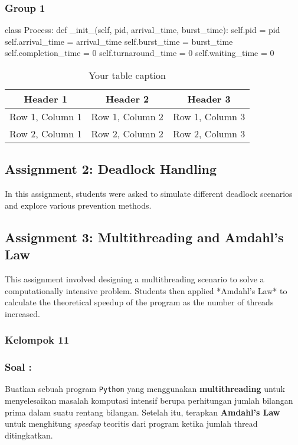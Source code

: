 \documentclass[12pt]{article}
\begin{document}
\subsubsection{Group 1}
\begin{python}
    class Process:
    def _init_(self, pid, arrival_time, burst_time):
    self.pid = pid
    self.arrival_time = arrival_time
    self.burst_time = burst_time
    self.completion_time = 0
    self.turnaround_time = 0
    self.waiting_time = 0
\end{python}

\begin{table}[htbp] %
    \centering
    \begin{tabular}{|c|c|c|} %
        \hline
        Header 1        & Header 2        & Header 3        \\ %
        \hline
        Row 1, Column 1 & Row 1, Column 2 & Row 1, Column 3 \\ %
        \hline
        Row 2, Column 1 & Row 2, Column 2 & Row 2, Column 3 \\ %
        \hline
    \end{tabular}
    \caption{Your table caption} %
    \label{tab:your_label} %
\end{table}

\subsection{Assignment 2: Deadlock Handling}
In this assignment, students were asked to simulate different deadlock
scenarios and explore various prevention methods.

\subsection{Assignment 3: Multithreading and Amdahl's Law}
This assignment involved designing a multithreading scenario to solve a
computationally intensive problem. Students then applied *Amdahl's Law* to
calculate the theoretical speedup of the program as the number of threads
increased.
\subsubsection{Kelompok 11}
\subsubsection*{Soal : }
Buatkan sebuah program \texttt{Python} yang menggunakan \textbf{multithreading} untuk menyelesaikan masalah komputasi intensif berupa perhitungan jumlah bilangan prima dalam suatu rentang bilangan. Setelah itu, terapkan \textbf{Amdahl's Law} untuk menghitung \textit{speedup} teoritis dari program ketika jumlah thread ditingkatkan.\\
\\
\end{document}
